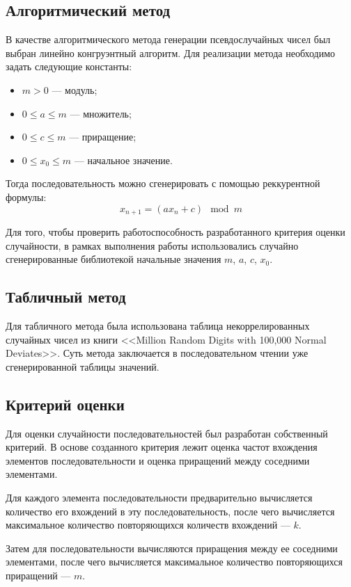 \documentclass[12pt]{report}
\begin{document}
\subsection*{Алгоритмический метод}
В качестве алгоритмического метода генерации псевдослучайных чисел был выбран линейно конгруэнтный алгоритм. Для реализации метода необходимо задать следующие константы:
\begin{itemize}
    \item $m > 0$ --- модуль; 
    \item $0 \leq a \leq m$ --- множитель;
    \item $0 \leq  c \leq m$ --- приращение;
    \item $0 \leq x_0 \leq m$ --- начальное значение.
\end{itemize}

Тогда последовательность можно сгенерировать с помощью реккурентной формулы:
\begin{equation}
    x_{n+1} = (ax_{n}+c)\mod{m}
\end{equation}

Для того, чтобы проверить работоспособность разработанного критерия оценки случайности, в рамках выполнения работы использовались случайно сгенерированные библиотекой начальные значения $m$, $a$, $c$, $x_0$.

\subsection*{Табличный метод}
Для табличного метода была использована таблица некоррелированных случайных чисел из книги <<Million Random Digits with 100,000 Normal Deviates>>. Суть метода заключается в последовательном чтении уже сгенерированной таблицы значений.

\subsection*{Критерий оценки}
Для оценки случайности последовательностей был разработан собственный критерий. В основе созданного критерия лежит оценка частот вхождения элементов последовательности и оценка приращений между соседними элементами.

Для каждого элемента последовательности предварительно вычисляется количество его вхождений в эту последовательность, после чего вычисляется максимальное количество повторяющихся количеств вхождений --- $k$. 

Затем для последовательности вычисляются приращения между ее соседними элементами, после чего вычисляется максимальное количество повторяющихся приращений --- $m$.
\end{document}
